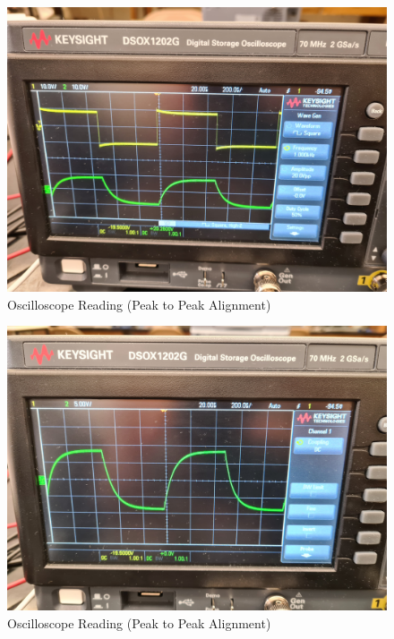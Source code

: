 \documentclass[a4paper,12pt]{article}
\begin{document}
\begin{figure}[H]
  \centering
  \includegraphics[width=1.0\linewidth]{../data/20211116_104711.jpg}    
  \begin{center}
    \begin{center}   
    \end{center}  \end{center}
  \caption{Oscilloscope Reading (Peak to Peak Alignment)}
  \label{osc}
\end{figure}

\begin{figure}[H]
  \centering
  \includegraphics[width=1.0\linewidth]{../data/20211116_104743.jpg}    
  \begin{center}
    \begin{center}   
    \end{center}  \end{center}
  \caption{Oscilloscope Reading (Peak to Peak Alignment)}
  \label{osc}
\end{figure}
\end{document}

